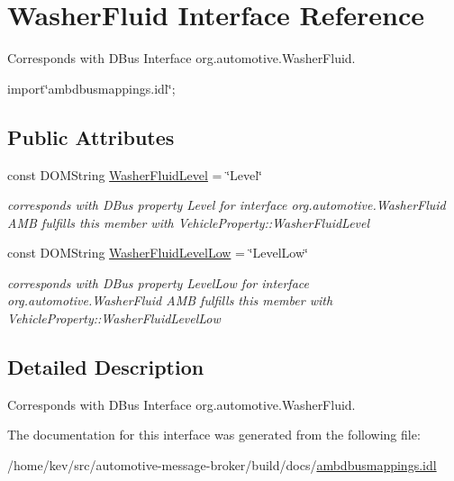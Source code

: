 \hypertarget{interfaceWasherFluid}{\section{Washer\+Fluid Interface Reference}
\label{interfaceWasherFluid}
}


Corresponds with D\+Bus Interface org.\+automotive.\+Washer\+Fluid.  




{\ttfamily import\char`\"{}ambdbusmappings.\+idl\char`\"{};}

\subsection*{Public Attributes}
\begin{DoxyCompactItemize}
\item 
\hypertarget{interfaceWasherFluid_aa1ddc39b08b28e3d3688604b1b07885b}{const D\+O\+M\+String \hyperlink{interfaceWasherFluid_aa1ddc39b08b28e3d3688604b1b07885b}{Washer\+Fluid\+Level} = \char`\"{}Level\char`\"{}}\label{interfaceWasherFluid_aa1ddc39b08b28e3d3688604b1b07885b}

\begin{DoxyCompactList}\small\item\em corresponds with D\+Bus property Level for interface org.\+automotive.\+Washer\+Fluid A\+M\+B fulfills this member with Vehicle\+Property\+::\+Washer\+Fluid\+Level \end{DoxyCompactList}\item 
\hypertarget{interfaceWasherFluid_ac9e7989758c74fc5ccee1e876bfc6a4b}{const D\+O\+M\+String \hyperlink{interfaceWasherFluid_ac9e7989758c74fc5ccee1e876bfc6a4b}{Washer\+Fluid\+Level\+Low} = \char`\"{}Level\+Low\char`\"{}}\label{interfaceWasherFluid_ac9e7989758c74fc5ccee1e876bfc6a4b}

\begin{DoxyCompactList}\small\item\em corresponds with D\+Bus property Level\+Low for interface org.\+automotive.\+Washer\+Fluid A\+M\+B fulfills this member with Vehicle\+Property\+::\+Washer\+Fluid\+Level\+Low \end{DoxyCompactList}\end{DoxyCompactItemize}


\subsection{Detailed Description}
Corresponds with D\+Bus Interface org.\+automotive.\+Washer\+Fluid. 

The documentation for this interface was generated from the following file\+:\begin{DoxyCompactItemize}
\item 
/home/kev/src/automotive-\/message-\/broker/build/docs/\hyperlink{ambdbusmappings_8idl}{ambdbusmappings.\+idl}\end{DoxyCompactItemize}
